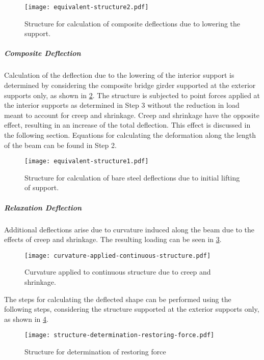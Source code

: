 \begin{figure}
  \texttt{[image: equivalent-structure2.pdf]}
  \caption{Structure for calculation of composite deflections due to lowering the support.}
  \label{fig:composite-deflections-lowering-support}
\end{figure}

\subparagraph*{Composite Deflection}
Calculation of the deflection due to the lowering of the interior support is determined by considering the composite bridge girder supported at the exterior supports only, as shown in \cref{fig:composite-girder-exterior-supports-only}. The structure is subjected to point forces applied at the interior supports as determined in Step 3 without the reduction in load meant to account for creep and shrinkage. Creep and shrinkage have the opposite effect, resulting in an increase of the total deflection. This effect is discussed in the following section. Equations for calculating the deformation along the length of the beam can be found in Step 2.

\begin{figure}
  \texttt{[image: equivalent-structure1.pdf]}
  \caption{Structure for calculation of bare steel deflections due to initial lifting of support.}
  \label{fig:composite-girder-exterior-supports-only}
\end{figure}

\subparagraph*{Relaxation Deflection}
Additional deflections arise due to curvature induced along the beam due to the effects of creep and shrinkage. The resulting loading can be seen in \cref{fig:curvature-applied-continuous-structure}.

\begin{figure}
  \texttt{[image: curvature-applied-continuous-structure.pdf]}
  \caption{Curvature applied to continuous structure due to creep and shrinkage.}
  \label{fig:curvature-applied-continuous-structure}
\end{figure}

The steps for calculating the deflected shape can be performed using the following steps, considering the
structure supported at the exterior supports only, as shown in \cref{fig:structure-determination-restoring-force}.

\begin{figure}
  \texttt{[image: structure-determination-restoring-force.pdf]}
  \caption{Structure for determination of restoring force}
  \label{fig:structure-determination-restoring-force}
\end{figure}

